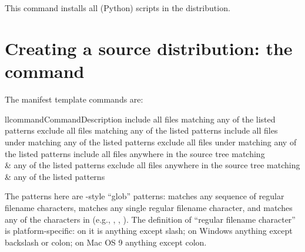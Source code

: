 \documentclass{manual}
\begin{document}
\subsection{\protect{}}
\label{install-scripts-cmd}
This command installs all (Python) scripts in the distribution.




\section{Creating a source distribution: the
            \protect{} command}
\label{sdist-cmd}



The manifest template commands are:

\begin{tableii}{ll}{command}{Command}{Description}
    {include all files matching any of the listed patterns}
    {exclude all files matching any of the listed patterns}
    {include all files under  matching any of the listed patterns}
    {exclude all files under  matching any of the listed patterns}
    {include all files anywhere in the source tree matching\\&
     any of the listed patterns}
    {exclude all files anywhere in the source tree matching\\&
     any of the listed patterns}
\end{tableii}

The patterns here are \UNIX-style ``glob'' patterns: \code{*} matches any
sequence of regular filename characters,  matches any single
regular filename character, and  matches any of the
characters in  (e.g., , ,
).  The definition of ``regular filename character'' is
platform-specific: on \UNIX{} it is anything except slash; on Windows
anything except backslash or colon; on Mac OS 9 anything except colon.
\end{document}
